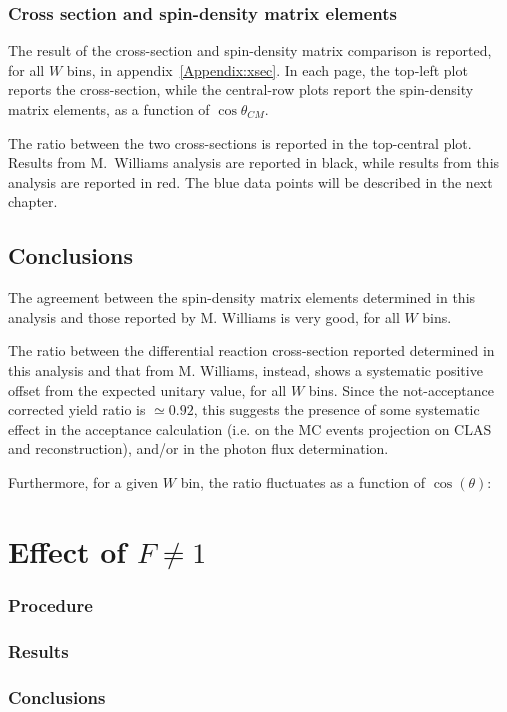 \documentclass[a4paper,10pt]{report}
\begin{document}
\subsection{Cross section and spin-density matrix elements}
The result of the cross-section and spin-density matrix comparison is reported, for all $W$ bins, in appendix~\ref{Appendix:xsec}. In each page, the top-left plot reports the cross-section, while the central-row plots report the spin-density matrix elements, as a function of $\cos{\theta}_{CM}$.

The ratio between the two cross-sections is reported in the top-central plot. Results from M.~Williams analysis are reported in black, while results from this analysis are reported in red. The blue data points will be described in the next chapter. 

\section{Conclusions}

The agreement between the spin-density matrix elements determined in this analysis and those reported by M. Williams is very good, for all $W$ bins. 

The ratio between the differential reaction cross-section reported determined in this analysis and that from M. Williams, instead, shows a systematic positive offset from the expected unitary value, for all $W$ bins.
Since the not-acceptance corrected yield ratio is $\simeq 0.92$, this suggests the presence of some systematic effect in the acceptance calculation (i.e. on the MC events projection on CLAS and reconstruction), and/or in the photon flux determination. 

Furthermore, for a given $W$ bin, the ratio fluctuates as a function of $\cos(\theta)$: 

\chapter{Effect of $F \neq 1$}

\subsection{Procedure}

\subsection{Results}

\subsection{Conclusions}
\end{document}
